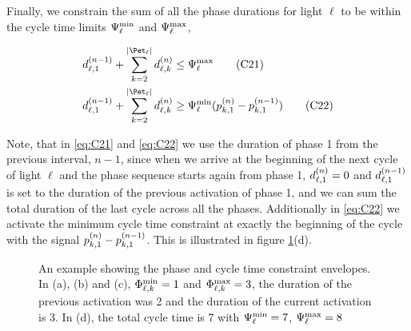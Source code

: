 Finally, we constrain the sum of all the phase durations for light $\ell$ to be
within the cycle time limits $\CTMIN{\ell}$ and $\CTMAX{\ell}$,

\begin{align}
\pd[n-1]{\ell}{1} + \sum\limits_{k=2}^{\Pn} \pd{\ell}{k} &\le \CTMAX{\ell} \tag{C21}\label{eq:C21}\\
\pd[n-1]{\ell}{1} + \sum\limits_{k=2}^{\Pn} \pd{\ell}{k} &\ge \CTMIN{\ell} (\p{k}{1} - \p[n-1]{k}{1})\tag{C22}\label{eq:C22}
\end{align}

Note, that in \ref{eq:C21} and \ref{eq:C22} we use the duration of phase 1 from
the previous interval, $n-1$,  since when we arrive at the beginning of the next
cycle of light $\ell$ and the phase sequence starts again from phase 1,
$\pd{\ell}{1}=0$ and $\pd[n-1]{\ell}{1}$ is set to the duration of the previous
activation of phase 1, and we can sum the total duration of the last cycle
across all the phases. Additionally in \ref{eq:C22} we activate the minimum
cycle time constraint at exactly the beginning of the cycle with the signal
$\p{k}{1} - \p[n-1]{k}{1}$. This is illustrated in figure
\ref{fig:phase_plots}(d).

\begin{figure*}[t!]
\centering
\caption{An example showing the phase and cycle time constraint envelopes. In
(a), (b) and (c), $\PTMIN{\ell}{k}=1$ and $\PTMAX{\ell}{k}=3$, the duration of
the previous activation was 2 and the duration of the current activation is 3.
In (d), the total cycle time is 7 with $\CTMIN{\ell}=7$, $\CTMAX{\ell}=8$}
\label{fig:phase_plots}
\end{figure*}

